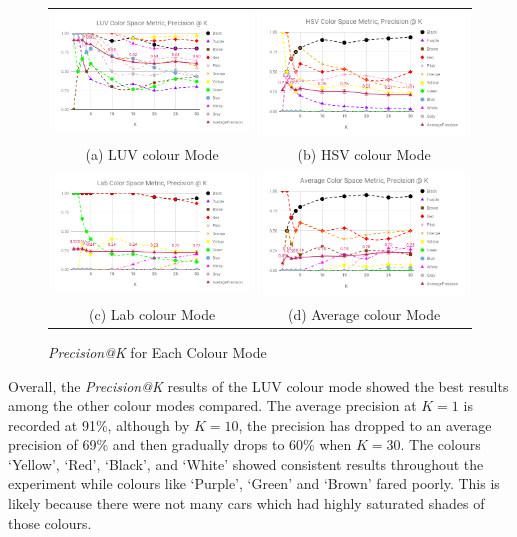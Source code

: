 \begin{figure}[tb!]
  \centering
\begin{tabular}{cc}
 \includegraphics[width=0.5\linewidth]{image/new/luv@k.png} &
 \includegraphics[width=0.5\linewidth]{image/new/hsv@k.png}\\
 (a) LUV colour Mode &
 (b) HSV colour Mode \\
 \includegraphics[width=0.5\linewidth]{image/new/lab@k.png} &
 \includegraphics[width=0.5\linewidth]{image/new/avg@k.png} \\
 (c) Lab colour Mode&
 (d) Average colour Mode \\
\end{tabular}
\caption{\textit{Precision@K} for Each Colour Mode}
  \label{fig:colorspace_score}
\end{figure}

Overall, the \textit{Precision@K} results of the LUV colour mode showed the best results among the other colour modes compared. The average precision at $K=1$ is recorded at 91\%, although by $K=10$, the precision has dropped to an average precision of 69\% and then gradually drops to 60\% when $K=30$. The colours `Yellow', `Red', `Black', and `White' showed consistent results throughout the experiment while colours like `Purple', `Green' and `Brown' fared poorly. This is likely because there were not many cars which had highly saturated shades of those colours.

